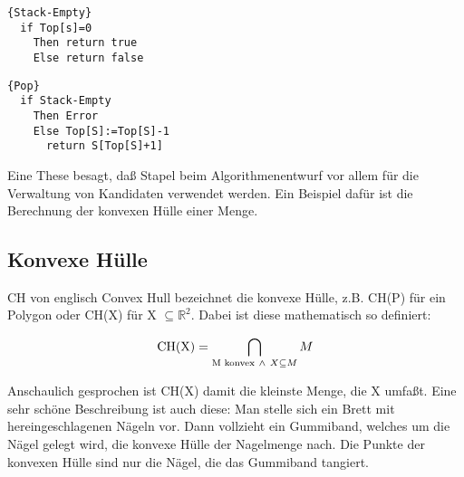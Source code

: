 \begin{Algorithmus}[H]
\begin{lstlisting}[frame=tlrb, mathescape=true, title=\textsc{Stack-Empty}, gobble=1]{Stack-Empty}
  if Top[s]=0 
    Then return true
    Else return false
\end{lstlisting}
\end{Algorithmus}

\begin{Algorithmus}[H]
\begin{lstlisting}[frame=tlrb, mathescape=true, title=\textsc{Pop}, gobble=1]{Pop}
  if Stack-Empty
    Then Error
    Else Top[S]:=Top[S]-1
      return S[Top[S]+1]
\end{lstlisting}
\end{Algorithmus}

Eine These besagt, daß Stapel beim Algorithmenentwurf vor allem für die Verwaltung von Kandidaten verwendet werden. Ein Beispiel
dafür ist die Berechnung der konvexen Hülle einer Menge.

\subsection{Konvexe Hülle}
CH von englisch Convex Hull bezeichnet die konvexe Hülle, z.B. CH(P) für ein Polygon oder CH(X) für X $\subseteq \mathbb{R}^2$. Dabei
ist diese mathematisch so definiert:
\begin{definition}
\[\mbox{CH(X)}=\bigcap_{\textnormal{M konvex}\ \wedge \ X \subseteq M} M\]
\end{definition}
Anschaulich gesprochen ist CH(X) damit die kleinste Menge, die X umfaßt. Eine sehr schöne Beschreibung ist auch diese: Man stelle sich
ein Brett mit hereingeschlagenen Nägeln vor. Dann vollzieht ein Gummiband, welches um die Nägel gelegt wird, die konvexe Hülle der
Nagelmenge nach. Die Punkte der konvexen Hülle sind nur die Nägel, die das Gummiband tangiert. 

